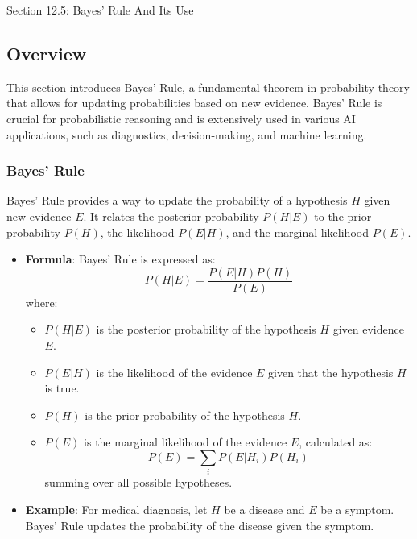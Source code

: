 \begin{notes}{Section 12.5: Bayes' Rule And Its Use}
    \subsection*{Overview}

    This section introduces Bayes' Rule, a fundamental theorem in probability theory that allows for updating probabilities based on new evidence. Bayes' Rule is crucial for probabilistic reasoning and 
    is extensively used in various AI applications, such as diagnostics, decision-making, and machine learning.
    
    \subsubsection*{Bayes' Rule}
    
    Bayes' Rule provides a way to update the probability of a hypothesis $H$ given new evidence $E$. It relates the posterior probability $P(H | E)$ to the prior probability $P(H)$, the likelihood 
    $P(E | H)$, and the marginal likelihood $P(E)$.
    
    \begin{highlight}
    
        \begin{itemize}
            \item \textbf{Formula}: Bayes' Rule is expressed as:
            \[
            P(H | E) = \frac{P(E | H) P(H)}{P(E)}
            \]
            where:
            \begin{itemize}
                \item $P(H | E)$ is the posterior probability of the hypothesis $H$ given evidence $E$.
                \item $P(E | H)$ is the likelihood of the evidence $E$ given that the hypothesis $H$ is true.
                \item $P(H)$ is the prior probability of the hypothesis $H$.
                \item $P(E)$ is the marginal likelihood of the evidence $E$, calculated as:
                \[
                P(E) = \sum_{i} P(E | H_i) P(H_i)
                \]
                summing over all possible hypotheses.
            \end{itemize}
            \item \textbf{Example}: For medical diagnosis, let $H$ be a disease and $E$ be a symptom. Bayes' Rule updates the probability of the disease given the symptom.
        \end{itemize}
    

\end{highlight}
\end{notes}
